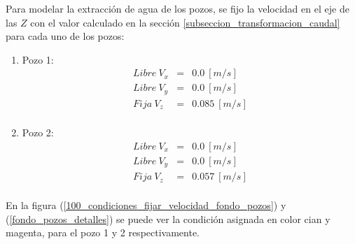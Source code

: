 \documentclass[10pt,a4paper,final]{article}
\begin{document}
Para modelar la extracción de agua de los pozos, se fijo la velocidad en el eje de las $Z$ con el valor calculado en la sección \ref{subseccion_transformacion_caudal} para cada uno de los pozos:
%
\begin{enumerate}
\item Pozo 1:
\begin{eqnarray*}
Libre~V_x&=&0.0~[m/s]\\
Libre~V_y&=&0.0~[m/s]\\
Fija~V_z&=&0.085~[m/s]\\
\end{eqnarray*}
%
\item Pozo 2:
\begin{eqnarray*}
Libre~V_x&=&0.0~[m/s]\\
Libre~V_y&=&0.0~[m/s]\\
Fija~V_z&=&0.057~[m/s]\\
\end{eqnarray*}
\end{enumerate}
%
En la figura (\ref{100_condiciones_fijar_velocidad_fondo_pozos}) y (\ref{fondo_pozos_detalles}) se puede ver la condición asignada en color cian y magenta, para el pozo 1 y 2 respectivamente.
\end{document}
